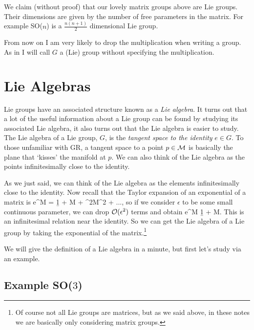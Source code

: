 \bcl 
    We claim (without proof) that our lovely matrix groups above are Lie groups. Their dimensions are given by the number of free parameters in the matrix. For example SO($n$) is a $\frac{n(n+1)}{2}$ dimensional Lie group.
\ecl 

\bnn 
    From now on I am very likely to drop the multiplication when writing a group. As in I will call $G$ a (Lie) group without specifying the multiplication. 
\enn 

\section{Lie Algebras}

Lie groups have an associated structure known as a \textit{Lie algebra}. It turns out that a lot of the useful information about a Lie group can be found by studying its associated Lie algebra, it also turns out that the Lie algebra is easier to study. The Lie algebra of a Lie group, $G$, is the \textit{tangent space to the identity} $e\in G$. To those unfamiliar with GR, a tangent space to a point $p\in\mathcal{M}$ is basically the plane that `kisses' the manifold at $p$. We can also think of the Lie algebra as the points infinitesimally close to the identity.

As we just said, we can think of the Lie algebra as the elements infinitesimally close to the identity. Now recall that the Taylor expansion of an exponential of a matrix is
\bse 
    e^{\epsilon M} = \b1 + \epsilon M + \epsilon^2M^2 + ...,
\ese 
so if we consider $\epsilon$ to be some small continuous parameter, we can drop $\mathcal{O}(\epsilon^2)$ terms and obtain 
\bse 
    e^{\epsilon M} \approx \b1 + \epsilon M.
\ese 
This is an infinitesimal relation near the identity. So we can get the Lie algebra of a Lie group by taking the exponential of the matrix.\footnote{Of course not all Lie groups are matrices, but as we said above, in these notes we are basically only considering matrix groups.} 

We will give the definition of a Lie algebra in a minute, but first let's study via an example. 

\subsection{Example SO($3$)}


